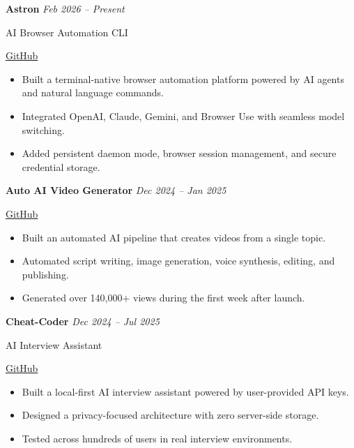 \documentclass[11pt,letterpaper]{article}
\begin{document}
\vspace{5pt}

\textbf{Astron}
\hfill
\textit{Feb 2026 -- Present}

AI Browser Automation CLI

{\small
\href{https://github.com/manideep1428/astron-browser}{GitHub}
}

\begin{itemize}
    \item Built a terminal-native browser automation platform powered by AI agents and natural language commands.
    \item Integrated OpenAI, Claude, Gemini, and Browser Use with seamless model switching.
    \item Added persistent daemon mode, browser session management, and secure credential storage.
\end{itemize}

\vspace{5pt}


\textbf{Auto AI Video Generator}
\hfill
\textit{Dec 2024 -- Jan 2025}

{\small
\href{https://github.com/manideep1428/auto_ai_video_generator}{GitHub}
}

\begin{itemize}
    \item Built an automated AI pipeline that creates videos from a single topic.
    \item Automated script writing, image generation, voice synthesis, editing, and publishing.
    \item Generated over 140,000+ views during the first week after launch.
\end{itemize}

\vspace{5pt}

\textbf{Cheat-Coder}
\hfill
\textit{Dec 2024 -- Jul 2025}

AI Interview Assistant

{\small
\href{https://github.com/manideep1428/cheat-coder}{GitHub}
}

\begin{itemize}
    \item Built a local-first AI interview assistant powered by user-provided API keys.
    \item Designed a privacy-focused architecture with zero server-side storage.
    \item Tested across hundreds of users in real interview environments.
\end{itemize}
\end{document}
